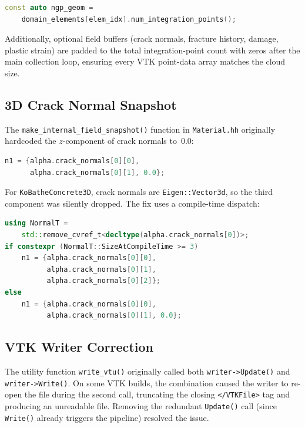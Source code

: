 \begin{lstlisting}[language=C++, basicstyle=\ttfamily\small]
const auto ngp_geom =
    domain_elements[elem_idx].num_integration_points();
\end{lstlisting}

Additionally, optional field buffers (crack normals, fracture history,
damage, plastic strain) are padded to the total integration-point count
with zeros after the main collection loop, ensuring every VTK point-data
array matches the cloud size.

\subsection{3D Crack Normal Snapshot}

The \texttt{make\_internal\_field\_snapshot()} function in
\texttt{Material.hh} originally hardcoded the $z$-component of crack
normals to~$0.0$:

\begin{lstlisting}[language=C++, basicstyle=\ttfamily\small]
n1 = {alpha.crack_normals[0][0],
      alpha.crack_normals[0][1], 0.0};
\end{lstlisting}

For \texttt{KoBatheConcrete3D}, crack normals are
\texttt{Eigen::Vector3d}, so the third component was silently dropped.
The fix uses a compile-time dispatch:

\begin{lstlisting}[language=C++, basicstyle=\ttfamily\small]
using NormalT =
    std::remove_cvref_t<decltype(alpha.crack_normals[0])>;
if constexpr (NormalT::SizeAtCompileTime >= 3)
    n1 = {alpha.crack_normals[0][0],
          alpha.crack_normals[0][1],
          alpha.crack_normals[0][2]};
else
    n1 = {alpha.crack_normals[0][0],
          alpha.crack_normals[0][1], 0.0};
\end{lstlisting}

\subsection{VTK Writer Correction}

The utility function \texttt{write\_vtu()} originally called both
\texttt{writer->Update()} and \texttt{writer->Write()}.  On some VTK
builds, the combination caused the writer to re-open the file during
the second call, truncating the closing \texttt{</VTKFile>} tag and
producing an unreadable file.  Removing the redundant
\texttt{Update()} call (since \texttt{Write()} already triggers the
pipeline) resolved the issue.


